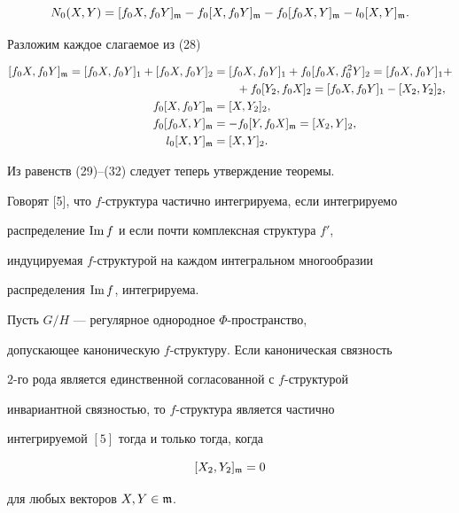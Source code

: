 \begin{pf}
\begin{equation} 


N_0(X,Y)=[f_0X,f_0Y]_{\frak m}-f_0[X,f_0Y]_{\frak m}- 


f_0[f_0X,Y]_{\frak m}-l_0[X,Y]_{\frak m}. 


\end{equation} 


Разложим каждое слагаемое из (28) 


\begin{align} 


[f_0X,f_0Y]_{\frak m}=[f_0X,f_0Y]_1+[f_0X,f_0Y]_2&= 


[f_0X,f_0Y]_1+f_0[f_0X,f^2_0Y]_2 =[f_0X,f_0Y]_1+\notag \\ 


&\qquad+f_0[Y_2,f_0X]_2= 


[f_0X,f_0Y]_1-[X_2,Y_2]_2, \\ 


% 


f_0[X,f_0Y]_{\frak m}&=[X,Y_2]_2, \\ 


f_0[f_0X,Y]_{\frak m}&=-f_0[Y,f_0X]_{\frak m}=[X_2,Y]_2,\\ 


l_0[X,Y]_{\frak m}&=[X,Y]_2. 


\end{align} 


Из равенств (29)--(32) следует теперь утверждение теоремы. 


\end{pf} 


 


Говорят [5], что $f$-структура частично интегрируема, если интегрируемо 


распределение $\operatorname{Im} f$ и если почти комплексная структура $f'$, 


индуцируемая $f$-структурой на каждом интегральном многообразии 


распределения $\operatorname{Im} f$, интегрируема. 


 


\begin{thm} Пусть $G/H$ --- регулярное однородное $\Phi$-пространство, 


допускающее каноническую $f$-структуру. Если каноническая связность 


$2$-го рода является единственной согласованной с $f$-структурой 


инвариантной связностью, то $f$-структура является частично 


интегрируемой $[5]$ тогда и только тогда, когда 


$$ 


[X_2,Y_2]_{\frak m}=0 


$$ 


для любых векторов $X,Y\in\frak m$. 


\end{thm} 


